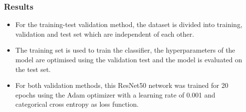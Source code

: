 \documentclass{beamer}
\begin{document}
\begin{frame}
\frametitle{Results}
\begin{itemize}
   \item For the training-test validation method, the dataset is divided into training, validation and test set which are independent of each other.
   \item The training set is used to train the classifier, the hyperparameters of the model are optimised using the validation test and the model is evaluated on the test set.
   \item For both validation methods, this ResNet50 network was trained for 20 epochs using the Adam optimizer with a learning rate of 0.001 and categorical cross entropy as loss function.  
\end{itemize}
\end{frame}

\end{document}
